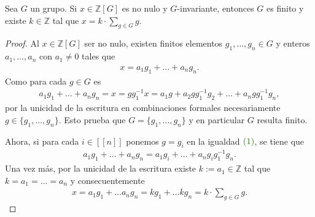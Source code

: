 \documentclass[11pt]{article}
\newcommand{\Z}{\mathbb{Z}}
\newcommand{\nat}[1]{[\![#1]\!]}
\newcommand{\paint}[1]{\color{color}{#1}}
\newenvironment{lemma}[2][Lema]{\begin{trivlist}
\item[\hskip \labelsep \paint{{\bfseries #1}}\hskip \labelsep {\bfseries #2.}]}{\end{trivlist}}
\begin{document}
\begin{lemma}{4} Sea $G$ un grupo. Si $x \in \Z[G]$ es no nulo y $G$-invariante, entonces $G$ es finito y existe $k \in \Z$ tal que $x = k \cdot \sum_{g \in G} g$.
\end{lemma}
\begin{proof} Al $x \in \Z[G]$ ser no nulo, existen finitos elementos $g_1, \dots, g_n \in G$ y enteros $a_1, \dots, a_n$ con $a_1 \neq 0$ tales que
\begin{align*}
x = a_1g_1 + \dots + a_ng_n.
\end{align*}
Como para cada $g \in G$ es
\begin{align}
a_1g_1 + \dots + a_ng_n = x = gg_1^{-1}x = a_1g + a_2gg_1^{-1}g_2 + \dots + a_ngg_1^{-1}g_n,
\end{align}
por la unicidad de la escritura en combinaciones formales necesariamente $g \in \{g_1, \dots, g_n\}$. 
Esto prueba que $G = \{g_1, \dots, g_n\}$ y en particular $G$ resulta finito. 

Ahora, si para cada $i \in \nat{n}$ ponemos $g = g_i$ en la igualdad $\paint{(1)}$, se tiene que
\begin{align*}
a_1g_1 + \dots + a_ng_n = a_1g_i + \dots + a_ng_ig_1^{-1}g_n.
\end{align*}
Una vez más, por la unicidad de la escritura existe $k := a_1 \in \Z$ tal que $k = a_1 = \dots = a_n$ y consecuentemente
\begin{align*}
x = a_1g_1 + \dots a_ng_n = kg_1 + \dots kg_n = k \cdot \sum_{g \in G}g.
\end{align*}
\end{proof}
\end{document}
